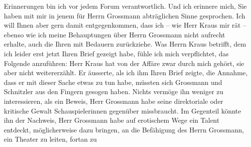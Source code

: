 \begin{ledgroupsized}[t]{13cm}
               Erinnerungen bin ich vor jedem Forum verantwortlich. Und ich erinnere mich, Sie haben
               mit mir in jenem für Herrn Grossmann
               abträglichen Sinne gesprochen. Ich will Ihnen aber gern damit entgegenkommen, dass
               ich – wie Herr Kraus mir rät – ebenso wie ich
               meine Behauptungen über Herrn Grossmann nicht
               aufrecht erhalte, auch die Ihren mit Bedauern zurückziehe.\pend
           \pstart
           Was Herrn Kraus betrifft, dem ich leider erst
               jetzt Ihren Brief gezeigt habe, fühle ich mich verpflichtet, das Folgende anzuführen:
               Herr Kraus hat von der Affäre zwar durch mich
               gehört, sie aber nicht weitererzählt. Er äusserte, als ich ihm Ihren Brief zeigte,
               die Annahme, dass er mit dieser Sache etwas zu tun habe, müssten sich Grossmann und Schnitzler aus den Fingern
               gesogen haben. Nichts vermöge ihn weniger zu interessieren, als ein Beweis, Herr Grossmann habe seine direktoriale oder
               kritische Gewalt Schauspielerinnen gegenüber missbraucht. Im Gegenteil könnte ihn der
               Nachweis, Herr Grossmann habe auf erotischem
               Wege ein Talent entdeckt, möglicherweise dazu bringen, an die Befähigung des Herrn
                  Grossmann, ein Theater zu leiten, fortan zu

\end{ledgroupsized}
